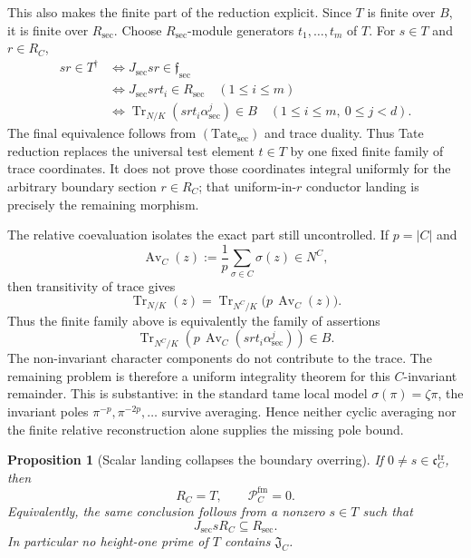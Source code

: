 \documentclass[11pt]{article}
\newtheorem{proposition}[theorem]{Proposition}
\theoremstyle{remark}
\theoremstyle{definition}
\begin{document}
This also makes the finite part of the reduction explicit.  Since \(T\) is
finite over \(B\), it is finite over \(R_{\mathrm{sec}}\).  Choose
\(R_{\mathrm{sec}}\)-module generators
\(t_1,\ldots,t_m\) of \(T\).  For \(s\in T\) and \(r\in R_C\),
\[
\begin{aligned}
  sr\in T^\dagger
  &\Longleftrightarrow
  J_{\mathrm{sec}}sr\in\mathfrak f_{\mathrm{sec}}\\
  &\Longleftrightarrow
  J_{\mathrm{sec}}srt_i\in R_{\mathrm{sec}}
    \quad(1\leq i\leq m)\\
  &\Longleftrightarrow
  \operatorname{Tr}_{N/K}
    (srt_i\alpha_{\mathrm{sec}}^j)\in B
    \quad(1\leq i\leq m,\ 0\leq j<d).
\end{aligned}
\]
The final equivalence follows from
\((\mathrm{Tate}_{\mathrm{sec}})\) and trace duality.  Thus Tate reduction
replaces the universal test element \(t\in T\) by one fixed finite family of
trace coordinates.  It does not prove those coordinates integral uniformly
for the arbitrary boundary section \(r\in R_C\); that uniform-in-\(r\)
conductor landing is precisely the remaining morphism.

The relative coevaluation isolates the exact part still uncontrolled.  If
\(p=|C|\) and
\[
  \operatorname{Av}_C(z):=\frac1p\sum_{\sigma\in C}\sigma(z)\in N^C,
\]
then transitivity of trace gives
\[
  \operatorname{Tr}_{N/K}(z)
  =\operatorname{Tr}_{N^C/K}
      \bigl(p\,\operatorname{Av}_C(z)\bigr).
\]
Thus the finite family above is equivalently the family of assertions
\[
  \operatorname{Tr}_{N^C/K}\!\left(
    p\,\operatorname{Av}_C
      (srt_i\alpha_{\mathrm{sec}}^j)\right)\in B.
\]
The non-invariant character components do not contribute to the trace.  The
remaining problem is therefore a uniform integrality theorem for this
\(C\)-invariant remainder.  This is substantive: in the standard tame local
model \(\sigma(\pi)=\zeta\pi\), the invariant poles
\(\pi^{-p},\pi^{-2p},\ldots\) survive averaging.  Hence neither cyclic
averaging nor the finite relative reconstruction alone supplies the missing
pole bound.

\begin{proposition}[Scalar landing collapses the boundary overring]
\label{prop:scalar-landing-collapses-overring}
If \(0\neq s\in\mathfrak c_C^{\mathrm{tr}}\), then
\[
  R_C=T,
  \qquad
  \mathcal P_C^{\mathrm{fm}}=0.
\]
Equivalently, the same conclusion follows from a nonzero \(s\in T\) such
that
\[
  J_{\mathrm{sec}}sR_C\subseteq R_{\mathrm{sec}}.
\]
In particular no height-one prime of \(T\) contains
\(\mathfrak J_C\).
\end{proposition}
\end{document}
